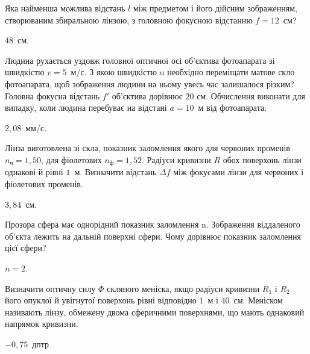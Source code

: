 \begin{problem}%
Яка найменша можлива відстань $l$ між предметом і його дійсним
зображенням, створюваним збиральною лінзою, з головною фокусною
відстанню $f = 12$~см?
\begin{solution}
	$48$~см.
\end{solution}
\end{problem}

\begin{problem}%
Людина рухається уздовж головної оптичної осі об'єктива
фотоапарата зі швидкістю $v = 5$~м/с. З якою швидкістю u необхідно
переміщати матове скло фотоапарата, щоб зображення людини на
ньому увесь час залишалося різким? Головна фокусна відстань
$f'$ об'єктива дорівнює $20$ см. Обчислення виконати для випадку, коли
людина перебуває на відстані $a = 10$~м від фотоапарата.
\begin{solution}
	$2,08$~мм/с.
\end{solution}
\end{problem}


\begin{problem}%
Лінза виготовлена зі скла, показник заломлення якого для червоних
променів $n_\text{ч} = 1,50$, для фіолетових $n_\text{ф} = 1,52$. Радіуси кривизни $R$ обох
поверхонь лінзи однакові й рівні $1$~м. Визначити відстань $\Delta f$ між
фокусами лінзи для червоних і фіолетових променів.
\begin{solution}
	$3,84$~см.
\end{solution}
\end{problem}

\begin{problem}%
Прозора сфера має однорідний показник заломлення n. Зображення
віддаленого об’єкта лежить на дальній поверхні сфери. Чому дорівнює
показник заломлення цієї сфери?
\begin{solution}
	$n = 2$.
\end{solution}
\end{problem}


\begin{problem}%
Визначити оптичну силу $\Phi$ скляного меніска, якщо радіуси кривизни
$R_1$ і $R_2$ його опуклої й увігнутої поверхонь рівні відповідно $1$~м і $40$~см.
Меніском називають лінзу, обмежену двома сферичними поверхнями,
що мають однаковий напрямок кривизни.
\begin{solution}
	$-0,75$~дптр
\end{solution}
\end{problem}


